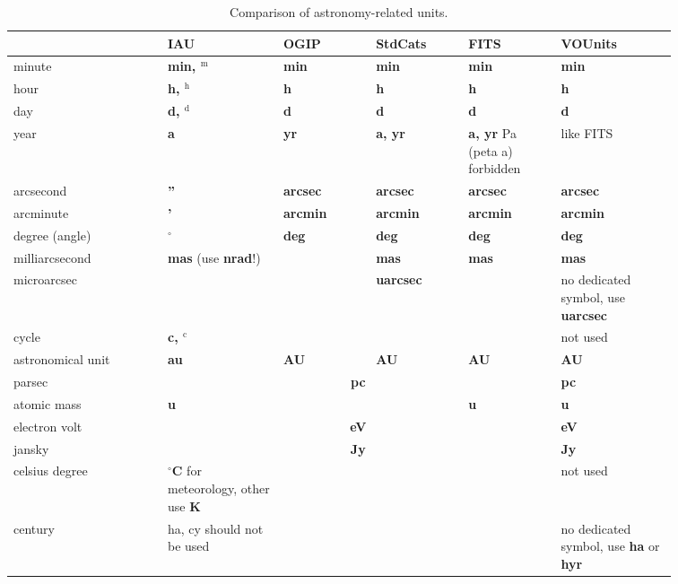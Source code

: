 \documentclass[11pt,notitlepage,onecolumn]{ivoa}
\newcommand{\unit}[1]{\textbf{\textsf{\color{orange}#1}}}
\begin{document}
\begin{table}[ht]
\begin{tabular}{|p{0.2\linewidth}|p{0.15\linewidth}|p{0.12\linewidth}|p{0.12\linewidth}|p{0.12\linewidth}|p{0.15\linewidth}|}
\hline
    & IAU & OGIP  & StdCats & FITS  & VOUnits\\\hline
    minute & \unit{min, $^\mathrm{m}$} & \unit{min} & \unit{min} & \unit{min} & \unit{min}\\\hline
    hour & \unit{h, $^\mathrm{h}$} & \unit{h} & \unit{h} & \unit{h} & \unit{h}\\\hline
    day & \unit{d, $^\mathrm{d}$} & \unit{d} & \unit{d} & \unit{d} & \unit{d}\\\hline
    year & \unit{a} & \unit{yr} & \unit{a, yr} & \unit{a, yr} Pa (peta a) forbidden& like FITS\\\hline
    arcsecond & \unit{''} & \unit{arcsec} & \unit{arcsec} & \unit{arcsec} & \unit{arcsec}\\\hline
    arcminute & \unit{'} & \unit{arcmin} & \unit{arcmin} & \unit{arcmin} & \unit{arcmin}\\\hline
    degree (angle) & \unit{$^\circ$} & \unit{deg} & \unit{deg} & \unit{deg} & \unit{deg}\\\hline
    milliarcsecond & \unit{mas} (use \unit{nrad}!)\raggedright &  & \unit{mas} & \unit{mas} & \unit{mas}\\\hline
    microarcsec &  &  & \unit{uarcsec} &  & no dedicated symbol, use
    \unit{uarcsec}\\\hline
    cycle & \unit{c, $^\mathrm{c}$} &  &  &  & not used\\\hline
    astronomical unit & \unit{au} & \unit{AU} & \unit{AU} & \unit{AU} & \unit{AU}\\\hline
    parsec & \multicolumn{4}{c|}{\unit{pc}} & \unit{pc}\\\hline
    atomic mass & \unit{u} &  &  & \unit{u} & \unit{u}\\\hline
    electron volt & \multicolumn{4}{c|}{\unit{eV}} & \unit{eV}\\\hline
    jansky & \multicolumn{4}{c|}{\unit{Jy}} & \unit{Jy}\\\hline
    celsius degree & \unit{$^\circ$C} for meteorology, other use \unit{K}\raggedright&  &  &  & not used\\\hline
    century & ha, cy should not be used &  &  &  & no dedicated symbol, use \unit{ha} or \unit{hyr}\\\hline
\end{tabular}
  \caption{Comparison of astronomy-related units.}
  \label{tabx:comparUnitAstro}
\end{table}
\end{document}
